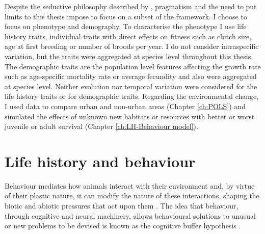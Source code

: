 Despite the seductive philosophy described by \citet{levins1985}, pragmatism and
the need to put limits to this thesis impose to focus on a subset of the
framework. I choose to focus on phenotype and demography.
To characterise the phenotype I use life history traits, individual traits
with direct effects on fitness such as clutch size, age at first breeding or
number of broods per year. I do not consider intraspecific variation, but the
traits were aggregated at species level throughout this thesis.
The demographic traits are the population level features affecting
the growth rate such as age-specific mortality rate or average fecundity and
also were aggregated at species level. Neither evolution nor temporal variation
were considered for the life history traits or for demographic traits.
Regarding the environmental change, I used data to compare urban and non-urban
areas (Chapter \ref{ch:POLS}) and simulated the effects of unknown new
habitats or resources with better or worst juvenile or adult survival (Chapter
\ref{ch:LH-Behaviour model}).


\section{Life history and behaviour}

Behaviour mediates how animals interact with their environment and, by virtue
of their plastic nature, it can modify the nature of these interactions, shaping
the biotic and abiotic pressures that act upon them
\citep{Futuyma1988,Losos2004,Lapiedra2013}. The idea that behaviour, through
cognitive and neural machinery, allows behavioural solutions to unusual or new
problems to be devised is known as the cognitive buffer hypothesis
\citep{Allman1993,VanSchaik2003,Sol2009,Sol2009a}.



